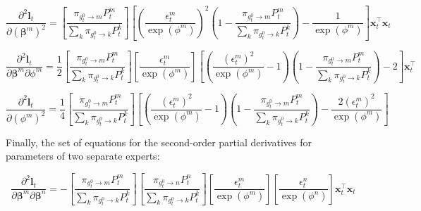 \documentclass[12pt]{article}
\newcommand{\gateprod}[2]{\pi_{#1 \longrightarrow #2}}
\theoremstyle{definition}
\begin{document}
\begin{equation} 
  \frac{\partial^{2} \boldsymbol{l}_{t}}{\partial (\boldsymbol{\beta}^{m})^{2}} =  \left[ \frac{\gateprod{g^{0}_{t}}{m} P^{m}_{t}}{ \sum_{k} \gateprod{g^{0}_{t}}{k} P^{k}_{t}} \right] \left[ \left( \frac{ \epsilon^{m}_{t} }{ \exp( \phi^{m}) } \right)^{2} \left( 1 - \frac{\gateprod{g^{0}_{t}}{m} P^{m}_{t}}{ \sum_{k} \gateprod{g^{0}_{t}}{k} P^{k}_{t}} \right) - \frac{1}{ \exp( \phi^{m} ) }  \right] \boldsymbol{x}_{t}^{\top} \boldsymbol{x}_{t}
\end{equation}

\begin{equation} 
  \frac{\partial^{2} \boldsymbol{l}_{t}}{\partial \boldsymbol{\beta}^{m} \partial \phi^{m}} =  \frac{1}{2} \left[ \frac{\gateprod{g^{0}_{t}}{m} P^{m}_{t}}{ \sum_{k} \gateprod{g^{0}_{t}}{k} P^{k}_{t}} \right] \left[ \frac{\epsilon^{m}_{t}}{\exp(\phi^{m})} \right] \left[ \left( \frac{ ( \epsilon^{m}_{t} )^{2} }{ \exp( \phi^{m}) } - 1 \right) \left( 1 - \frac{\gateprod{g^{0}_{t}}{m} P^{m}_{t}}{ \sum_{k} \gateprod{g^{0}_{t}}{k} P^{k}_{t}} \right) - 2  \right] \boldsymbol{x}_{t}^{\top}
\end{equation}

\begin{equation} 
  \frac{\partial^{2} \boldsymbol{l}_{t}}{\partial (\phi^{m})^{2}} =  \frac{1}{4} \left[ \frac{\gateprod{g^{0}_{t}}{m} P^{m}_{t}}{ \sum_{k} \gateprod{g^{0}_{t}}{k} P^{k}_{t}} \right]  \left[ \left( \frac{ ( \epsilon^{m}_{t} )^{2} }{ \exp( \phi^{m}) } - 1 \right) \left( 1 - \frac{\gateprod{g^{0}_{t}}{m} P^{m}_{t}}{ \sum_{k} \gateprod{g^{0}_{t}}{k} P^{k}_{t}} \right) - \frac{ 2 (\epsilon^{m}_{t})^{2} }{ \exp(\phi^{m}) }  \right] 
\end{equation}

Finally, the set of equations for the second-order partial derivatives for parameters
of two separate experts:

\begin{equation} 
  \frac{\partial^{2} \boldsymbol{l}_{t}}{\partial \boldsymbol{\beta}^{m} \partial \boldsymbol{\beta}^{n} } = - \left[ \frac{\gateprod{g^{0}_{t}}{m} P^{m}_{t}}{ \sum_{k} \gateprod{g^{0}_{t}}{k} P^{k}_{t}} \right] \left[ \frac{\gateprod{g^{0}_{t}}{n} P^{n}_{t}}{ \sum_{k} \gateprod{g^{0}_{t}}{k} P^{k}_{t}} \right]  \left[ \frac{\epsilon^{m}_{t}}{\exp(\phi^{m})} \right] \left[ \frac{\epsilon^{n}_{t}}{\exp(\phi^{n})} \right] \boldsymbol{x}_{t}^{\top} \boldsymbol{x}_{t} 
\end{equation}
\end{document}

